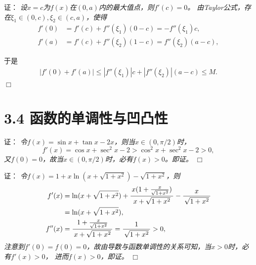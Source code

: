 \begin{frame}
	\linespread{1.5}
	
	\pause
	\vspace{-1em}
	\small 证：\it 
	设$x=c$为$f(x)$在$(0,a)$内的最大值点，则$f'(c)=0$。
	由Taylor公式，存在$\xi_1\in(0,c),\xi_2\in(c,a)$，使得
	\begin{align*}
		f'(0)&=f'(c)+f''(\xi_1)(0-c)=-f''(\xi_1)c,\\
		f'(a)&=f'(c)+f''(\xi_2)(1-c)=f''(\xi_2)(a-c),
	\end{align*}
	
	\pause 于是
	\begin{align*}
		|f'(0)+f'(a)|
		\leq|f''(\xi_1)|c+|f''(\xi_2)|(a-c)\leq M.
	\end{align*}
	\hfill$\Box$
\end{frame}

\section{3.4 函数的单调性与凹凸性}

\begin{frame}
	\linespread{1.5}
	
	\pause
	\small 证：\it 
		令$f(x)=\sin x+\tan x-2x$，则当$x\in(0,\pi/2)$时，
	$$f'(x)=\cos x+\sec^2x-2>\cos^2x+\sec^2x-2>0,$$
	\pause 又$f(0)=0$，故当$x\in(0,\pi/2)$时，必有$f(x)>0$。即证。
	\hfill$\Box$
\end{frame}

\begin{frame}
	\linespread{1.5}
	
	\pause
	\small 证：\it 
	令$f(x)=1+x\ln(x+\sqrt{1+x^2})-\sqrt{1+x^2}$，则
	\begin{align*}
		f'(x)&=\ln(x+\sqrt{1+x^2})+\displaystyle\frac{\,{x(1+\frac{x}{\sqrt{1+x^2}})}\,}{\,{x+\sqrt{1+x^2}}\,}-\displaystyle\frac{\,{x}\,}{\,{\sqrt{1+x^2}}\,}\\
		&=\ln(x+\sqrt{1+x^2}),\\
		f''(x)&=\displaystyle\frac{\,{1+\frac{x}{\sqrt{1+x^2}}}\,}{\,{x+\sqrt{1+x^2}}\,}=\displaystyle\frac{\,{1}\,}{\,{\sqrt{1+x^2}}\,}>0,
	\end{align*}
	\pause 注意到$f'(0)=f(0)=0$，故由导数与函数单调性的关系可知，当$x>0$时，必有$f'(x)>0$，
	进而$f(x)>0$，即证。
	\hfill$\Box$
\end{frame}

